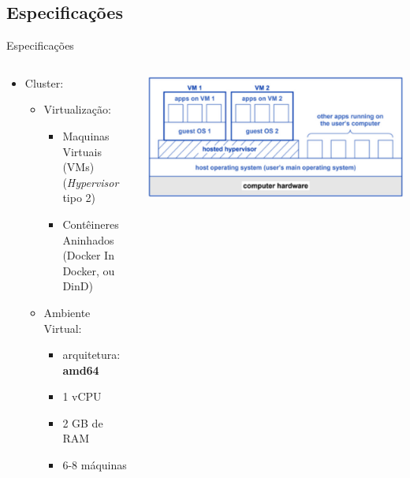 \documentclass[10pt,brazil]{beamer}
\theoremstyle{definition}
\begin{document}
\subsection{Especificações}

\begin{frame}[allowframebreaks]{Especificações}
  \begin{columns}
    \begin{column}{0.5\textwidth}
      \begin{itemize}
        \item Cluster:
              \begin{itemize}
                \item Virtualização:
                      \begin{itemize}
                        \item Maquinas Virtuais (VMs) (\emph{Hypervisor} tipo 2)
                        \item Contêineres Aninhados (Docker In Docker, ou DinD)
                      \end{itemize}
              \end{itemize}
        \begin{itemize}
            \item Ambiente Virtual:
              \begin{itemize}
              \item  arquitetura: \textbf{amd64}
                \item 1 vCPU
                \item 2 GB de RAM
                \item 6-8 máquinas
              \end{itemize}
        \end{itemize}
    \end{itemize}
    \end{column}
    \begin{column}{0.5\textwidth}  %
      \begin{center}
        \includegraphics[width=1\textwidth]{vms.png}
      \end{center}
    \end{column}
  \end{columns}
  

\end{frame}
\end{document}
